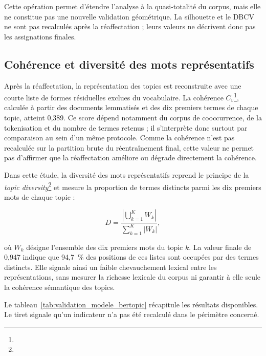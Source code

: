 Cette opération permet d'étendre l'analyse à la quasi-totalité du corpus, mais elle ne constitue pas une nouvelle validation géométrique. La silhouette et le DBCV ne sont pas recalculés après la réaffectation ; leurs valeurs ne décrivent donc pas les assignations finales.

\subsection{Cohérence et diversité des mots représentatifs}

Après la réaffectation, la représentation des topics est reconstruite avec une courte liste de formes résiduelles exclues du vocabulaire. La cohérence \(C_v\)\footnote{}, calculée à partir des documents lemmatisés et des dix premiers termes de chaque topic, atteint 0,389. Ce score dépend notamment du corpus de cooccurrence, de la tokenisation et du nombre de termes retenus ; il s'interprète donc surtout par comparaison au sein d'un même protocole. Comme la cohérence n'est pas recalculée sur la partition brute du réentraînement final, cette valeur ne permet pas d'affirmer que la réaffectation améliore ou dégrade directement la cohérence.

Dans cette étude, la diversité des mots représentatifs reprend le principe de la \textit{topic diversity}\footnote{} et mesure la proportion de termes distincts parmi les dix premiers mots de chaque topic :

\[
D
=
\frac{\left|\bigcup_{k=1}^{K} W_k\right|}
{\sum_{k=1}^{K}\left|W_k\right|},
\]

où \(W_k\) désigne l'ensemble des dix premiers mots du topic \(k\). La valeur finale de 0,947 indique que 94,7~\% des positions de ces listes sont occupées par des termes distincts. Elle signale ainsi un faible chevauchement lexical entre les représentations, sans mesurer la richesse lexicale du corpus ni garantir à elle seule la cohérence sémantique des topics.

Le tableau~\ref{tab:validation_modele_bertopic} récapitule les résultats disponibles. Le tiret signale qu'un indicateur n'a pas été recalculé dans le périmètre concerné.

